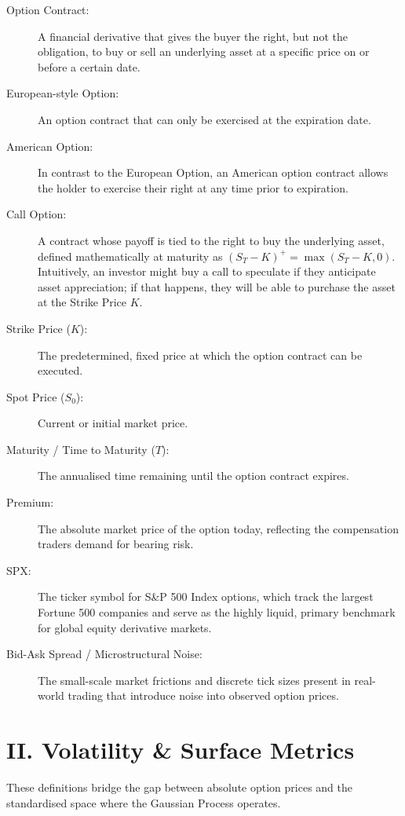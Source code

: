\documentclass[12pt,oneside]{report}
\theoremstyle{definition}
\theoremstyle{remark}
\begin{document}
\begin{description}
    \item[Option Contract:] A financial derivative that gives the buyer the right, but not the obligation, to buy or sell an underlying asset at a specific price on or before a certain date.
    \item[European-style Option:] An option contract that can only be exercised at the expiration date.
    \item[American Option:] In contrast to the European Option, an American option contract allows the holder to exercise their right at any time prior to expiration.
    \item[Call Option:] A contract whose payoff is tied to the right to buy the underlying asset, defined mathematically at maturity as $(S_T - K)^+ = \max(S_T - K, 0)$. Intuitively, an investor might buy a call to speculate if they anticipate asset appreciation; if that happens, they will be able to purchase the asset at the Strike Price $K$.
    \item[Strike Price ($K$):] The predetermined, fixed price at which the option contract can be executed.
    \item[Spot Price ($S_0$):] Current or initial market price.
    \item[Maturity / Time to Maturity ($T$):] The annualised time remaining until the option contract expires.
    \item[Premium:] The absolute market price of the option today, reflecting the compensation traders demand for bearing risk.
    \item[SPX:] The ticker symbol for S\&P 500 Index options, which track the largest Fortune 500 companies and serve as the highly liquid, primary benchmark for global equity derivative markets.
    \item[Bid-Ask Spread / Microstructural Noise:] The small-scale market frictions and discrete tick sizes present in real-world trading that introduce noise into observed option prices.
\end{description}

\newpage
\section*{II. Volatility \& Surface Metrics}
{}
\label{sec:glossary_volatility_surface_metrics}
These definitions bridge the gap between absolute option prices and the standardised space where the Gaussian Process operates.
\end{document}
